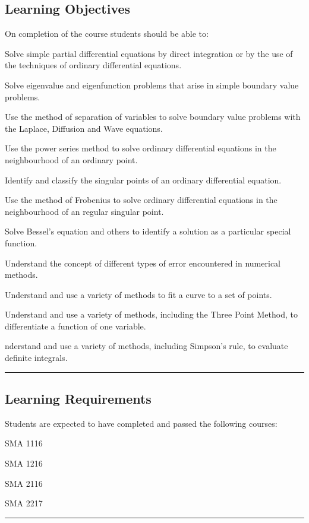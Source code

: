 \subsection*{Learning Objectives}
On completion of the course students should be able to:
\begin{outline}
    \1      Solve simple partial differential equations by direct integration or by the use of the techniques of ordinary differential equations.

    \1  	Solve eigenvalue and eigenfunction problems that arise in simple boundary value problems.

    \1  	Use the method of separation of variables to solve boundary value problems with the Laplace, Diffusion and Wave equations.

    \1      Use the power series method to solve ordinary differential equations in the neighbourhood of an ordinary point.

    \1      Identify and classify the singular points of an ordinary differential equation.

    \1      Use the method of Frobenius to solve ordinary differential equations in the neighbourhood of an regular singular point.

    \1      Solve Bessel’s equation and others to identify a solution as a particular special function.

    \1      Understand the concept of different types of error encountered in numerical methods.

    \1      Understand and use a variety of methods to fit a curve to a set of points.

    \1      Understand and use a variety of methods, including the Three Point Method, to differentiate a function of one variable.

    \1      nderstand and use a variety of methods, including Simpson’s rule, to evaluate definite integrals.

\end{outline}
\vspace{2ex}\hrule\vspace{2ex}


\subsection*{Learning Requirements}
Students are expected to have completed and passed the following courses:
\begin{outline}
    \1      SMA 1116

    \1      SMA 1216

    \1      SMA 2116

    \1      SMA 2217


\end{outline}
\vspace{2ex}\hrule\vspace{2ex}



